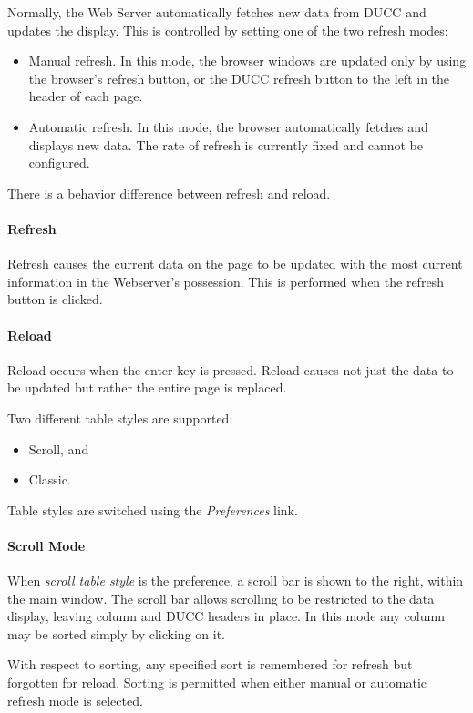     Normally, the Web Server automatically fetches new data from DUCC and updates the display.
    This is controlled by setting one of the two refresh modes:
    \begin{itemize}
      \item Manual refresh.  In this mode, the browser windows are updated only by using the
        browser's refresh button, or the DUCC refresh button to the left in the header of
        each page.
      \item Automatic refresh. In this mode, the browser automatically fetches and displays
        new data.  The rate of refresh is currently fixed and cannot be configured.
    \end{itemize}
    
    There is a behavior difference between refresh and reload.
    \paragraph{Refresh}
    Refresh causes the current data on the page to be updated with the most
    current information in the Webserver's possession.  This is performed
    when the refresh button is clicked.
    \paragraph{Reload}
    Reload occurs when the enter key is pressed.  Reload causes not just the
    data to be updated but rather the entire page is replaced.
    
    Two different table styles are supported:
    \begin{itemize}
      \item Scroll, and
      \item Classic.
    \end{itemize}
    Table styles are switched using the {\em Preferences} link.

    \paragraph{Scroll Mode}  When {\em scroll table style} is the preference, a scroll bar is
    shown to the right, within the main window.  The scroll bar allows scrolling to be restricted to the data
    display, leaving column and DUCC headers in place.  In this mode any column may be sorted
    simply by clicking on it.
    
    With respect to sorting, any specified sort is remembered for refresh
    but forgotten for reload.  Sorting is permitted when either manual
    or automatic refresh mode is selected.
    
